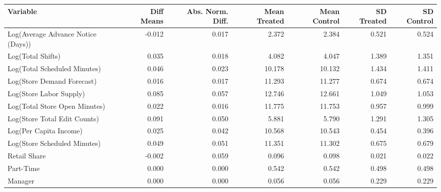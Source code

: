 \begingroup\scriptsize
\begin{tabular}{lrrrrrr}
  \toprule
Variable & Diff Means & Abs. Norm. Diff. & Mean Treated & Mean Control & SD Treated & SD Control \\ 
  \midrule
    Log(Average Advance Notice (Days)) & -0.012 & 0.017 & 2.372 & 2.384 & 0.521 & 0.524 \\ 
Log(Total Shifts) & 0.035 & 0.018 & 4.082 & 4.047 & 1.389 & 1.351 \\ 
  Log(Total Scheduled Minutes) & 0.046 & 0.023 & 10.178 & 10.132 & 1.434 & 1.411 \\ 
  Log(Store Demand Forecast) & 0.016 & 0.017 & 11.293 & 11.277 & 0.674 & 0.674 \\ 
  Log(Store Labor Supply) & 0.085 & 0.057 & 12.746 & 12.661 & 1.049 & 1.053 \\ 
  Log(Total Store Open Minutes) & 0.022 & 0.016 & 11.775 & 11.753 & 0.957 & 0.999 \\ 
  Log(Store Total Edit Counts) & 0.091 & 0.050 & 5.881 & 5.790 & 1.291 & 1.305 \\ 
  Log(Per Capita Income) & 0.025 & 0.042 & 10.568 & 10.543 & 0.454 & 0.396 \\ 
 Log(Store Scheduled Minutes) & 0.049 & 0.051 & 11.351 & 11.302 & 0.675 & 0.679 \\ 
  Retail Share & -0.002 & 0.059 & 0.096 & 0.098 & 0.021 & 0.022 \\ 
  Part-Time & 0.000 & 0.000 & 0.542 & 0.542 & 0.498 & 0.498 \\ 
  Manager & 0.000 & 0.000 & 0.056 & 0.056 & 0.229 & 0.229 \\ 
   \bottomrule
\end{tabular}
\endgroup
